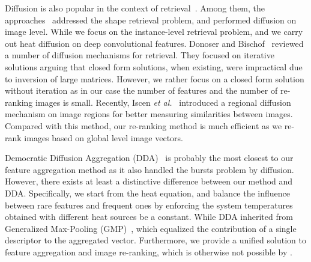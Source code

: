 \documentclass[journal]{IEEEtran}
\begin{document}
Diffusion is also popular in the context of retrieval~\cite{egozi2010improving, yang2009locally, donoser2013diffusion, furuya2015diffusion, iscen2017efficient}. Among them, the approaches~\cite{egozi2010improving, yang2009locally, furuya2015diffusion} addressed the shape retrieval problem, and performed diffusion on image level. While we focus on the instance-level retrieval problem, and we carry out heat diffusion on deep convolutional features.
Donoser and Bischof~\cite{donoser2013diffusion} reviewed a number of diffusion
mechanisms for retrieval. They focused on iterative solutions
arguing that closed form solutions, when existing, were impractical
due to inversion of large matrices.
However, we rather focus on a closed form solution without iteration as in our case the number of features and the number of re-ranking images is small.
Recently, Iscen \textit{et al.}~\cite{iscen2017efficient} introduced a regional diffusion mechanism on image
regions for better measuring similarities between images. Compared with this method, our re-ranking method is much efficient as we re-rank images based on global level image vectors.

Democratic Diffusion Aggregation (DDA)~\cite{gao2016democratic} is probably the most closest to our feature aggregation method  as it also handled the bursts problem by diffusion.
However, there exists at least a distinctive difference between our method and DDA.
Specifically, we start from the heat equation, and balance the
influence between rare features and frequent ones by enforcing
the system temperatures obtained with different heat sources be a constant.
While DDA inherited from Generalized Max-Pooling (GMP)~\cite{murray2017interferences}, which equalized the contribution of a single descriptor to the aggregated vector.
Furthermore, we provide a unified solution to feature aggregation and image re-ranking, which is otherwise not possible by \cite{gao2016democratic}.
\end{document}
